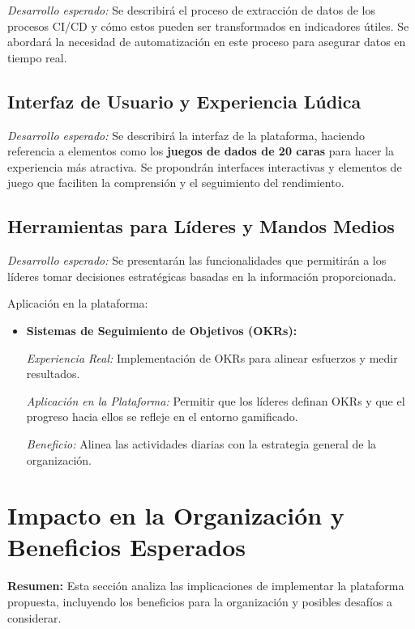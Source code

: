 \documentclass[journal]{IEEEtran}
\begin{document}
\textit{Desarrollo esperado:} Se describirá el proceso de extracción de datos de los procesos CI/CD y cómo estos pueden ser transformados en indicadores útiles. Se abordará la necesidad de automatización en este proceso para asegurar datos en tiempo real.

\subsection{\textbf{ Interfaz de Usuario y Experiencia Lúdica}}

\textit{Desarrollo esperado:} Se describirá la interfaz de la plataforma, haciendo referencia a elementos como los \textbf{juegos de dados de 20 caras} para hacer la experiencia más atractiva. Se propondrán interfaces interactivas y elementos de juego que faciliten la comprensión y el seguimiento del rendimiento.

\subsection{\textbf{ Herramientas para Líderes y Mandos Medios}}

\textit{Desarrollo esperado:} Se presentarán las funcionalidades que permitirán a los líderes tomar decisiones estratégicas basadas en la información proporcionada.

Aplicación en la plataforma:

\begin{itemize}
    \item \textbf{Sistemas de Seguimiento de Objetivos (OKRs):}
    
    \textit{Experiencia Real:} Implementación de OKRs para alinear esfuerzos y medir resultados.
    
    \textit{Aplicación en la Plataforma:} Permitir que los líderes definan OKRs y que el progreso hacia ellos se refleje en el entorno gamificado.
    
    \textit{Beneficio:} Alinea las actividades diarias con la estrategia general de la organización.
\end{itemize}

\section{\textbf{\Large Impacto en la Organización y Beneficios Esperados}}

\textbf{Resumen:} Esta sección analiza las implicaciones de implementar la plataforma propuesta, incluyendo los beneficios para la organización y posibles desafíos a considerar.
\end{document}
